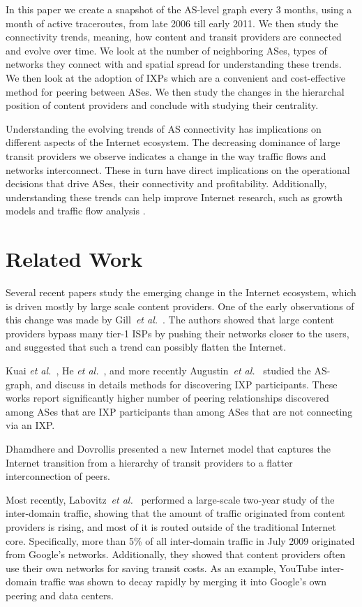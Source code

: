 \documentclass[conference]{IEEEtran}
\newcommand{\etal}{{\em et al.}}
\begin{document}
In this paper we create a snapshot of the AS-level graph every 3 months, using a month of active traceroutes, from late 2006 till early 2011. 
We then
study the connectivity trends, meaning, how content and transit providers are connected and evolve over time. We look
at the number of neighboring ASes, types of networks they connect with and spatial spread for understanding these trends. We
then look at the adoption of IXPs which are a convenient and cost-effective method for peering between ASes. We then study
the changes in the hierarchal position of content providers and conclude with studying their centrality.

Understanding the evolving trends of AS connectivity has implications on different aspects of the Internet ecosystem.
The decreasing dominance of large transit providers we observe indicates a change in the way traffic flows and
networks interconnect. These in turn have direct implications on
the operational decisions that drive ASes, their connectivity and profitability. Additionally, understanding these trends
can help improve Internet research, such as growth models \cite{amogh2010} and traffic flow analysis \cite{labovitz}.

\section{Related Work}
Several recent papers study the emerging change in the Internet ecosystem, which is driven mostly by large scale content providers.
One of the early observations of this change was made by Gill~\etal~\cite{flatnet}. The authors showed that large content providers
bypass many tier-1 ISPs by pushing their networks closer to the users, and suggested that such a trend can possibly flatten
the Internet.

Kuai \etal~\cite{596565}, He \etal~\cite{HeSFK07,lordoflinks}, and more recently Augustin~\etal~\cite{ixpsmapped} studied the AS-graph,  and
discuss in details methods for
discovering IXP participants. These works
report significantly higher number of peering relationships
discovered among ASes that are IXP participants than among ASes that
are not connecting via an IXP.

Dhamdhere and Dovrollis \cite{amogh2010} presented a new Internet model that captures the
Internet transition from a hierarchy of transit providers to a flatter interconnection of peers.

Most recently, Labovitz~\etal~\cite{labovitz} performed a large-scale two-year study of the inter-domain
traffic, showing that the amount of traffic originated from content providers is rising, and most of it
is routed outside of the traditional Internet core. Specifically, more than 5\% of all inter-domain
traffic in July 2009 originated from Google's networks. Additionally, they showed that content providers
often use their own networks for saving transit costs. As an example, YouTube inter-domain traffic was shown
to decay rapidly by merging it into Google's own peering and data centers.
\end{document}
